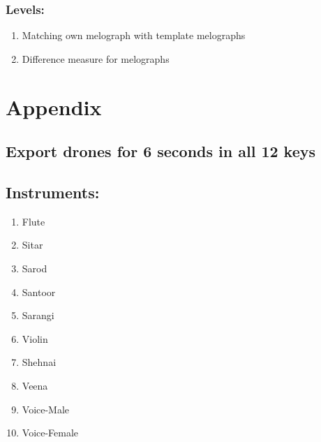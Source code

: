 \documentclass[11pt]{article}
\begin{document}
\subsubsection{Levels:}
\label{sec-1-12-3}


\begin{enumerate}
\item Matching own melograph with template melographs
\item Difference measure for melographs
\end{enumerate}
\section{Appendix}
\label{sec-2}
\subsection{Export drones for 6 seconds in all 12 keys}
\label{sec-2-1}
\subsection{Instruments:}
\label{sec-2-2}

\begin{enumerate}
\item Flute
\item Sitar
\item Sarod
\item Santoor
\item Sarangi
\item Violin
\item Shehnai
\item Veena
\item Voice-Male
\item Voice-Female
\end{enumerate}
\end{document}
